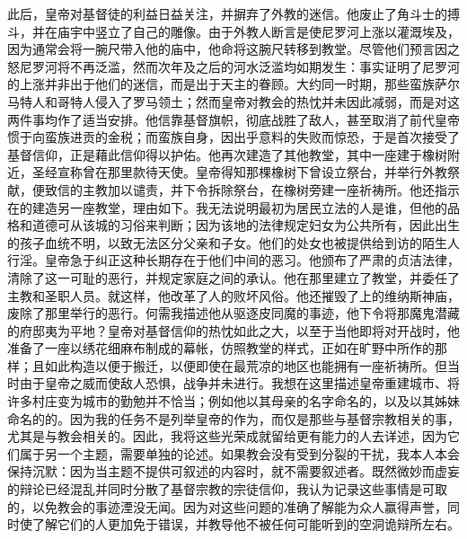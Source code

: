 此后，皇帝对基督徒的利益日益关注，并摒弃了外教的迷信。他废止了角斗士的搏斗，并在庙宇中竖立了自己的雕像。由于外教人断言是使尼罗河上涨以灌溉埃及，因为通常会将一腕尺带入他的庙中，他命将这腕尺转移到教堂。尽管他们预言因之怒尼罗河将不再泛滥，然而次年及之后的河水泛滥均如期发生：事实证明了尼罗河的上涨并非出于他们的迷信，而是出于天主的眷顾。大约同一时期，那些蛮族萨尔马特人和哥特人侵入了罗马领土；然而皇帝对教会的热忱并未因此减弱，而是对这两件事均作了适当安排。他信靠基督旗帜，彻底战胜了敌人，甚至取消了前代皇帝惯于向蛮族进贡的金税；而蛮族自身，因出乎意料的失败而惊恐，于是首次接受了基督信仰，正是藉此信仰得以护佑。他再次建造了其他教堂，其中一座建于橡树附近，圣经宣称曾在那里款待天使。皇帝得知那棵橡树下曾设立祭台，并举行外教祭献，便致信的主教加以谴责，并下令拆除祭台，在橡树旁建一座祈祷所。他还指示在的建造另一座教堂，理由如下。我无法说明最初为居民立法的人是谁，但他的品格和道德可从该城的习俗来判断；因为该地的法律规定妇女为公共所有，因此出生的孩子血统不明，以致无法区分父亲和子女。他们的处女也被提供给到访的陌生人行淫。皇帝急于纠正这种长期存在于他们中间的恶习。他颁布了严肃的贞洁法律，清除了这一可耻的恶行，并规定家庭之间的承认。他在那里建立了教堂，并委任了主教和圣职人员。就这样，他改革了人的败坏风俗。他还摧毁了上的维纳斯神庙，废除了那里举行的恶行。何需我描述他从驱逐皮同魔的事迹，他下令将那魔鬼潜藏的府邸夷为平地？皇帝对基督信仰的热忱如此之大，以至于当他即将对开战时，他准备了一座以绣花细麻布制成的幕帐，仿照教堂的样式，正如在旷野中所作的那样；且如此构造以便于搬迁，以便即使在最荒凉的地区也能拥有一座祈祷所。但当时由于皇帝之威而使敌人恐惧，战争并未进行。我想在这里描述皇帝重建城市、将许多村庄变为城市的勤勉并不恰当；例如他以其母亲的名字命名的，以及以其姊妹命名的的。因为我的任务不是列举皇帝的作为，而仅是那些与基督宗教相关的事，尤其是与教会相关的。因此，我将这些光荣成就留给更有能力的人去详述，因为它们属于另一个主题，需要单独的论述。如果教会没有受到分裂的干扰，我本人本会保持沉默：因为当主题不提供可叙述的内容时，就不需要叙述者。既然微妙而虚妄的辩论已经混乱并同时分散了基督宗教的宗徒信仰，我认为记录这些事情是可取的，以免教会的事迹湮没无闻。因为对这些问题的准确了解能为众人赢得声誉，同时使了解它们的人更加免于错误，并教导他不被任何可能听到的空洞诡辩所左右。\par


